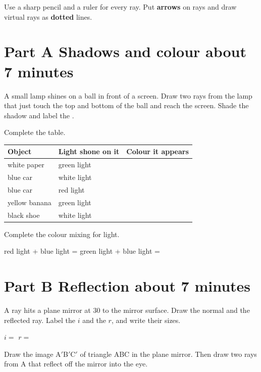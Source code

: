 \documentclass[11pt]{article}
\begin{document}
Use a sharp pencil and a ruler for every ray. Put \textbf{arrows} on rays and draw virtual rays as \textbf{dotted} lines.

\section*{Part A \quad Shadows and colour \hfill\normalfont\small about 7 minutes}

\Q A small lamp shines on a ball in front of a screen. Draw two rays from the lamp that just touch the top and bottom of the ball and reach the screen. Shade the shadow and label the \tUmbra.
\drawbox{66mm}{\TaskShadow[8mm]}

\Q Complete the table.\par\smallskip
\begin{tabularx}{\textwidth}{@{}l l X@{}}
\toprule
\textbf{Object} & \textbf{Light shone on it} & \textbf{Colour it appears}\\
\midrule
white paper & green light & \\[5mm]
blue car & white light & \\[5mm]
blue car & red light & \\[5mm]
yellow banana & green light & \\[5mm]
black shoe & white light & \\[5mm]
\bottomrule
\end{tabularx}

\Q Complete the colour mixing for light.\par\smallskip
red light + blue light = \blank[40mm] \qquad green light + blue light = \blank[40mm]

\newpage
{}
\section*{Part B \quad Reflection \hfill\normalfont\small about 7 minutes}

\Q A ray hits a plane mirror at 30\textdegree{} to the mirror surface. Draw the normal and the reflected ray. Label the \tAoI{} $i$ and the \tAoR{} $r$, and write their sizes.
\par\smallskip $i =$ \blank[25mm] \qquad $r =$ \blank[25mm]

\Q Draw the image A$'$B$'$C$'$ of triangle ABC in the plane mirror. Then draw two rays from A that reflect off the mirror into the eye.
\drawbox{66mm}{\TaskTriangle[8.6mm]}
\end{document}
